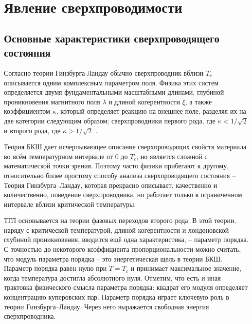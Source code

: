 \chapter{Явление сверхпроводимости}

\section{Основные характеристики сверхпроводящего состояния}

Согласно теории Гинзбурга-Ландау обычно сверхпроводник вблизи \( T_c \) 
описывается одним комплексным параметром поля. Физика этих систем определяется 
двумя фундаментальными масштабными длинами, глубиной проникновения магнитного 
поля \( \lambda \) и длиной когерентности \( \xi \), а также коэффициентом 
\( \kappa \), который определяет реакцию на внешнее поле, разделяя их на две  
категории следующим образом; сверхпроводники первого рода, где 
\( \kappa < 1/\sqrt{2} \) и второго рода, где \( \kappa > 1/\sqrt{2} \) 
\cite{bib:3}.

Теория БКШ дает исчерпывающее описание сверхпроводящих свойств материала во 
всём температурном интервале от \( 0 \) до \( T_c \), но является сложной с 
математической точки зрения. Поэтому часто физики прибегают к другому, 
относительно более простому способу анализа сверхпроводящего состояния -- 
Теория Гинзбурга–Ландау, которая прекрасно описывает, качественно и 
количественно, поведение сверхпроводника, но работает только в ограниченном 
интервале вблизи критической температуры.

ТГЛ основывается на теории фазовых переходов второго рода. В этой теории, 
наряду с критической температурой, длиной когерентности и лондоновской глубиной 
проникновения, вводится ещё одна характеристика, -- параметр порядка. С 
точностью до некоторого коэффициента пропорциональности можно считать, что 
модуль параметра порядка -- это энергетическая щель в теории БКШ. Параметр 
порядка равен нулю при \( T = T_c \) и принимает максимальное значение, когда 
температура достигла абсолютного нуля. Отметим, что есть и иная трактовка 
физического смысла параметра порядка: квадрат его модуля определяет 
концентрацию куперовских пар. Параметр порядка играет ключевую роль в теории 
Гинзбурга–Ландау. Через него выражается свободная энергия сверхпроводника. 
\cite{bib:net}

